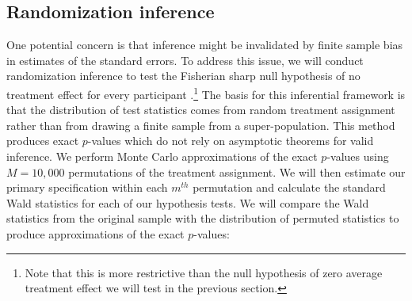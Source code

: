 \documentclass[11pt, a4paper]{article}\usepackage[]{graphicx}\usepackage[]{color}
\begin{document}
        \begin{table}[h]
        \centering
        \caption{Control variables for covariate adjustment}
        \label{tab:controlvars}
        \end{table}

    \subsection{Randomization inference} %

        One potential concern is that inference might be invalidated by finite sample bias in estimates of the standard errors. To address this issue, we will conduct randomization inference to test the Fisherian sharp null hypothesis of no treatment effect for every participant \parencite{fisher_design_1935}.\footnote{Note that this is more restrictive than the null hypothesis of zero average treatment effect we will test in the previous section.} The basis for this inferential framework is that the distribution of test statistics comes from random treatment assignment rather than from drawing a finite sample from a super-population. This method produces exact $p$-values which do not rely on asymptotic theorems for valid inference. We perform Monte Carlo approximations of the exact $p$-values using $M=10,000$ permutations of the treatment assignment. We will then estimate our primary specification within each $m^{th}$ permutation and calculate the standard Wald statistics for each of our hypothesis tests. We will compare the Wald statistics from the original sample with the distribution of permuted statistics to produce approximations of the exact $p$-values:
\end{document}
